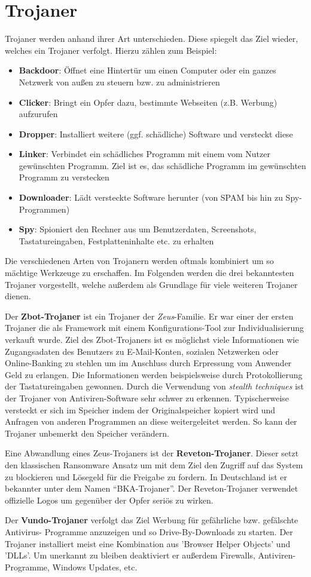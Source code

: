 \section{Trojaner}\label{sec:trojaner}
Trojaner werden anhand ihrer Art unterschieden.
Diese spiegelt das Ziel wieder, welches ein Trojaner verfolgt.
Hierzu zählen zum Beispiel:
\begin{itemize}
    \item \textbf{Backdoor}: Öffnet eine Hintertür um einen Computer oder ein ganzes Netzwerk von außen zu steuern bzw. zu administrieren
    \item \textbf{Clicker}: Bringt ein Opfer dazu, bestimmte Webseiten (z.B. Werbung) aufzurufen 
    \item \textbf{Dropper}: Installiert weitere (ggf. schädliche) Software und versteckt diese
    \item \textbf{Linker}: Verbindet ein schädliches Programm mit einem vom Nutzer gewünschten Programm. Ziel ist es, das schädliche Programm im gewünschten Programm zu verstecken
    \item \textbf{Downloader}: Lädt versteckte Software herunter (von SPAM bis hin zu Spy-Programmen)
    \item \textbf{Spy}: Spioniert den Rechner aus um Benutzerdaten, Screenshots, Tastatureingaben, Festplatteninhalte etc. zu erhalten
\end{itemize}
Die verschiedenen Arten von Trojanern werden oftmals kombiniert um so mächtige Werkzeuge zu erschaffen. 
Im Folgenden werden die drei bekanntesten Trojaner vorgestellt, welche außerdem als Grundlage für viele weiteren Trojaner dienen. 

Der \textbf{Zbot-Trojaner} ist ein Trojaner der \textit{Zeus}-Familie. Er war einer der ersten
Trojaner die als Framework mit einem Konfigurations-Tool zur Individualisierung verkauft wurde.
Ziel des Zbot-Trojaners ist es möglichst viele Informationen wie Zugangsadaten des Benutzers zu E-Mail-Konten, sozialen Netzwerken oder Online-Banking zu stehlen
um im Anschluss durch Erpressung vom Anwender Geld zu erlangen.
Die Informationen werden beispielsweise durch Protokollierung der Tastatureingaben gewonnen. 
Durch die Verwendung von \textit{stealth techniques} ist der Trojaner von Antiviren-Software sehr schwer zu erkennen.
Typischerweise versteckt er sich im Speicher indem der Originalspeicher kopiert wird und Anfragen von anderen Programmen
an diese weitergeleitet werden.
So kann der Trojaner unbemerkt den Speicher verändern.

Eine Abwandlung eines Zeus-Trojaners ist der \textbf{Reveton-Trojaner}.
Dieser setzt den klassischen Ransomware Ansatz um mit dem Ziel den Zugriff auf das System zu blockieren und Lösegeld für die Freigabe zu fordern.
In Deutschland ist er bekannter unter dem Namen \enquote{BKA-Trojaner}.
Der Reveton-Trojaner verwendet offizielle Logos um gegenüber der Opfer seriös zu wirken.

Der \textbf{Vundo-Trojaner} verfolgt das Ziel Werbung für gefährliche bzw. gefälschte Antivirus-
Programme anzuzeigen und so Drive-By-Downloads zu starten. Der Trojaner installiert
meist eine Kombination aus 'Browser Helper Objects' und 'DLLs'. Um unerkannt zu bleiben
deaktiviert er außerdem Firewalls, Antiviren-Programme, Windows Updates, etc. 
\cite{BEKTRO}